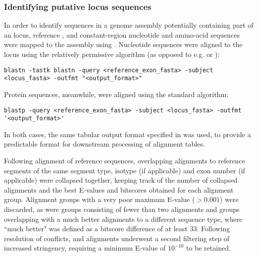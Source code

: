 \subsubsection{Identifying putative locus sequences}
\label{sec:methods_comp_locus_scaffolds}


In order to identify sequences in a genome assembly potentially containing part of an \igh{} locus, reference \vh, \jh and constant-region nucleotide and amino-acid sequences were mapped to the assembly using  \parencite{altschul1990blast,altschul1997blast}. Nucleotide sequences were aligned to the locus using the relatively permissive  algorithm (as opposed to e.g.  or ):

\begin{lstlisting}
blastn -tastk blastn -query <reference_exon_fasta> -subject <locus_fasta> -outfmt "<output_format>"
\end{lstlisting}

Protein sequences, meanwhile, were aligned using the standard  algorithm:

\begin{lstlisting}
blastp -query <reference_exon_fasta> -subject <locus_fasta> -outfmt '<output_format>'
\end{lstlisting}

In both cases, the same tabular output format specified in  was used, to provide a predictable format for downstream processing of  alignment tables.

Following alignment of reference sequences, overlapping alignments to reference segments of the same segment type, isotype (if applicable) and exon number (if applicable) were collapsed together, keeping track of the number of collapsed alignments and the best E-values and bitscores obtained for each alignment group. Alignment groups with a very poor maximum E-value ($> 0.001$) were discarded, as were groups consisting of fewer than two alignments and groups overlapping with a much better alignments to a different sequence type, where ``much better" was defined as a bitscore difference of at least 33. Following resolution of conflicts, \vh and \ch alignments underwent a second filtering step of increased stringency, requiring a minimum E-value of $10^{-10}$ to be retained. 

